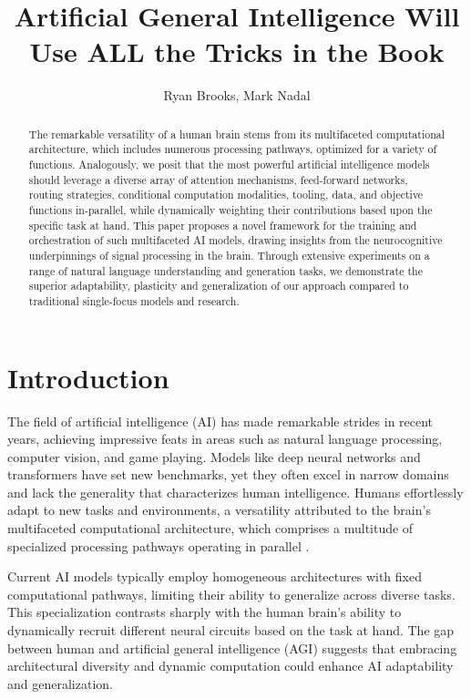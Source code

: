 \documentclass{article}
\begin{document}
\title{Artificial General Intelligence Will Use ALL the Tricks in the Book}
\author{Ryan Brooks, Mark Nadal}
\date{}

\maketitle

\begin{abstract}
    The remarkable versatility of a human brain stems from its multifaceted computational architecture, which includes numerous processing pathways, optimized for a variety of functions. Analogously, we posit that the most powerful artificial intelligence models should leverage a diverse array of attention mechanisms, feed-forward networks, routing strategies, conditional computation modalities, tooling, data, and objective functions in-parallel, while dynamically weighting their contributions based upon the specific task at hand. This paper proposes a novel framework for the training and orchestration of such multifaceted AI models, drawing insights from the neurocognitive underpinnings of signal processing in the brain. Through extensive experiments on a range of natural language understanding and generation tasks, we demonstrate the superior adaptability, plasticity and generalization of our approach compared to traditional single-focus models and research.
\end{abstract}

\section{Introduction}

The field of artificial intelligence (AI) has made remarkable strides in recent years, achieving impressive feats in areas such as natural language processing, computer vision, and game playing. Models like deep neural networks and transformers have set new benchmarks, yet they often excel in narrow domains and lack the generality that characterizes human intelligence. Humans effortlessly adapt to new tasks and environments, a versatility attributed to the brain's multifaceted computational architecture, which comprises a multitude of specialized processing pathways operating in parallel \cite{vaswani2017attention}.

Current AI models typically employ homogeneous architectures with fixed computational pathways, limiting their ability to generalize across diverse tasks. This specialization contrasts sharply with the human brain's ability to dynamically recruit different neural circuits based on the task at hand. The gap between human and artificial general intelligence (AGI) suggests that embracing architectural diversity and dynamic computation could enhance AI adaptability and generalization.
\end{document}
